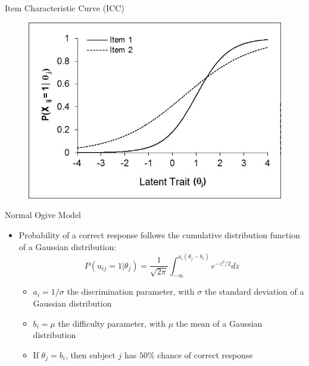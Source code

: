 \documentclass{beamer}
\theoremstyle{definition}
\begin{document}

\begin{frame}{Item Characteristic Curve (ICC)}
\begin{figure}
\includegraphics[width=.7\textwidth]{img/ML2.jpg}
\end{figure}
\end{frame}

\begin{frame}{Normal Ogive Model}
\begin{itemize}
  \item Probability of a correct response follows the cumulative distribution function of a Gaussian distribution:
  \[P(u_{ij}=1 | \theta_j) = \frac{1}{\sqrt{2\pi}}\int_{-\infty}^{a_i(\theta_j - b_i)} e^{-z^2/2} dz \]
  \begin{itemize}
    \item<2-> $a_i = 1/\sigma$ the discrimination parameter, with $\sigma$ the standard deviation of a Gaussian distribution
    \item<2-> $b_i = \mu$ the difficulty parameter, with $\mu$ the mean of a Gaussian distribution
    \item<2-> If $\theta_j = b_i$, then subject $j$ has $50\%$ chance of correct response
  \end{itemize}
\end{itemize}
\end{frame}
\end{document}
